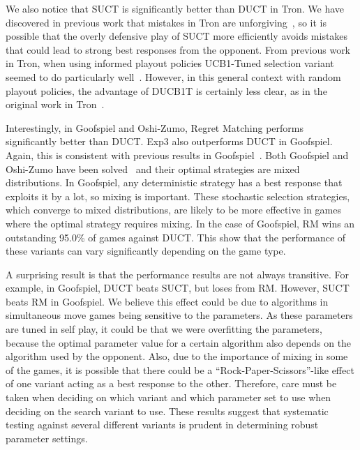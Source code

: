 \documentclass[conference]{IEEEtran}
\begin{document}
We also notice that SUCT is significantly better than DUCT in Tron. We have discovered in previous work that mistakes in
Tron are unforgiving~\cite{Lanctot13Tron}, 
so it is possible that the overly defensive play of SUCT more efficiently avoids mistakes that could lead to strong best responses from the opponent.
From previous work in Tron, when using informed playout policies UCB1-Tuned selection variant seemed to do particularly 
well~\cite{Perick12Comparison,Lanctot13Tron}. However, in this general context with random playout policies, the advantage of DUCB1T is certainly 
less clear, as in the original work in Tron~\cite{Samothrakis10Tron}.


Interestingly, in Goofspiel and Oshi-Zumo, Regret Matching performs significantly better than DUCT. Exp3 also outperforms DUCT in Goofspiel. 
Again, this is consistent with previous results in Goofspiel~\cite{Lanctot13Goofspiel}. Both Goofspiel and Oshi-Zumo have been 
solved~\cite{Buro03OshiZumo,Rhoads12Computer} and their optimal strategies are mixed distributions. In Goofspiel, any deterministic strategy 
has a best response that exploits it by a lot, so mixing is important. These stochastic selection strategies, 
which converge to mixed distributions, are likely to be more effective in games where the optimal strategy requires mixing. 
In the case of Goofspiel, RM wins an outstanding 95.0\% of games against DUCT. This show that the performance of these variants can vary 
significantly depending on the game type. 

A surprising result is that the performance results are not always transitive. For example, in Goofspiel, DUCT beats SUCT, but loses from RM. 
However, SUCT beats RM in Goofspiel. We believe this effect could be due to algorithms in simultaneous move games being
sensitive to the parameters. As these parameters are tuned in self play, it could be that we were overfitting the parameters, because 
the optimal parameter value for a certain algorithm also depends on the algorithm used by the opponent. Also, due to the importance of mixing 
in some of the games, it is possible that there could be a ``Rock-Paper-Scissors''-like effect of one variant acting as a best response to 
the other. Therefore, care must be taken when deciding on which variant and which parameter set to use when deciding on the search variant to 
use. These results suggest that systematic testing against several different variants is prudent in determining robust parameter settings. 
\end{document}
